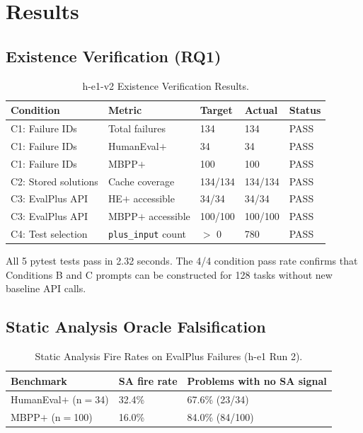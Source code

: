 \section{Results}

\subsection{Existence Verification (RQ1)}

\begin{table}[h]
\centering
\caption{h-e1-v2 Existence Verification Results.}
\label{tab:verification}
\begin{tabular}{lllll}
\toprule
Condition & Metric & Target & Actual & Status \\
\midrule
C1: Failure IDs & Total failures & 134 & 134 & PASS \\
C1: Failure IDs & HumanEval$+$ & 34 & 34 & PASS \\
C1: Failure IDs & MBPP$+$ & 100 & 100 & PASS \\
C2: Stored solutions & Cache coverage & 134/134 & 134/134 & PASS \\
C3: EvalPlus API & HE$+$ accessible & 34/34 & 34/34 & PASS \\
C3: EvalPlus API & MBPP$+$ accessible & 100/100 & 100/100 & PASS \\
C4: Test selection & \texttt{plus\_input} count & $>$ 0 & 780 & PASS \\
\bottomrule
\end{tabular}
\end{table}

All 5 pytest tests pass in 2.32 seconds. The 4/4 condition pass rate confirms that
Conditions B and C prompts can be constructed for 128 tasks without new baseline
API calls.

\subsection{Static Analysis Oracle Falsification}

\begin{table}[h]
\centering
\caption{Static Analysis Fire Rates on EvalPlus Failures (h-e1 Run 2).}
\label{tab:sa-rates}
\begin{tabular}{lll}
\toprule
Benchmark & SA fire rate & Problems with no SA signal \\
\midrule
HumanEval$+$ (n$=$34) & 32.4\% & 67.6\% (23/34) \\
MBPP$+$ (n$=$100) & 16.0\% & 84.0\% (84/100) \\
\bottomrule
\end{tabular}
\end{table}

